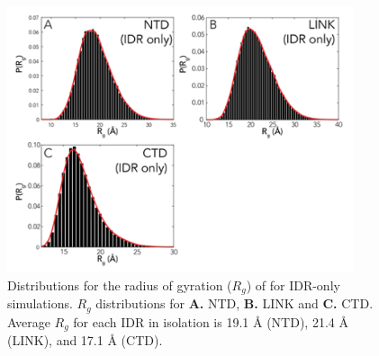 \documentclass[../main.tex]{subfiles}
\begin{document}
        \begin{figure}[!htb] %
            \centering
            \includegraphics[width=4in]{appendix-e-fig16.png}
            \caption[Distributions for the radius of gyration ($R_g$) of for IDR-only simulations.]
                {Distributions for the radius of gyration ($R_g$) of for IDR-only simulations. $R_g$ distributions for \textbf{A.} NTD, \textbf{B.} LINK and \textbf{C.} CTD. Average $R_g$ for each IDR in isolation is 19.1 \AA{} (NTD), 21.4 \AA{} (LINK), and 17.1 \AA{} (CTD).}
            \label{fig:appendix-e-fig16}
        \end{figure}
% 
% 
% 
\end{document}

